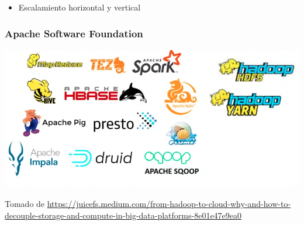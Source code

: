\documentclass[
10pt, %
aspectratio=169, %
]{beamer}
\begin{document}
\begin{frame}
\begin{itemize}
			\item Escalamiento horizontal y vertical 
			
		\end{itemize}
		
		
	\end{frame}
	
	\begin{frame}
		
		\frametitle{Apache Software Foundation}
		
		\centering
		\includegraphics[scale=0.55]{apache.png}
		
		
		{\scriptsize Tomado de 	\url{https://juicefs.medium.com/from-hadoop-to-cloud-why-and-how-to-decouple-storage-and-compute-in-big-data-platforms-8e01e47e9ea0}}
		
	\end{frame}
	
\end{document}

